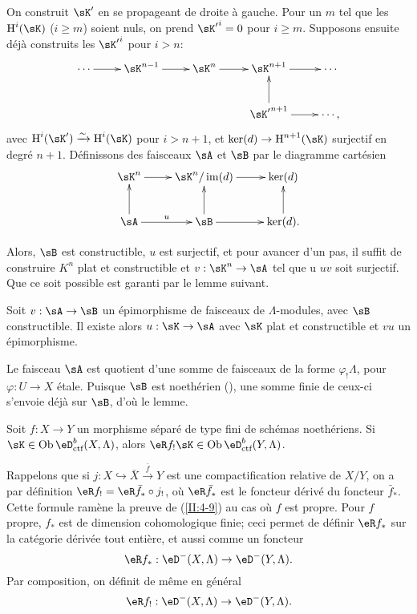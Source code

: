 On construit $\sK'$ en se propageant de droite à gauche. Pour un $m$ tel que les 
$\h^i(\sK)$ ($i\geqslant m$) soient nuls, on prend ${\sK'}^i = 0$ pour 
$i\geqslant m$. Supposons ensuite déjà construits les ${\sK'}^i$ pour 
$i>n$:
\[\xymatrix{
  \cdots \ar[r] 
    & \sK^{n-1} \ar[r] 
    & \sK^n \ar[r] 
    & \sK^{n+1} \ar[r] 
    & \cdots \\
  & & & {\sK'}^{n+1} \ar[u] \ar[r] 
    & \cdots \text{,}
}\]
avec $\h^i(\sK')\iso \h^i(\sK)$ pour $i>n+1$, et $\ker(d)\to\h^{n+1}(\sK)$ surjectif 
en degré $n+1$. Définissons des faisceaux $\sA$ et $\sB$ par le diagramme 
cartésien 
\[\xymatrix{
  \sK^n \ar[r] 
    & \sK^n/\im(d) \ar[r] 
    & \ker(d) \\
  \sA \ar[u] \ar[r]^u 
    & \sB \ar[u]\ar[r] 
    & \ker(d) \ar[u] \text{.}
}\]

Alors, $\sB$ est constructible, $u$ est surjectif, et pour avancer d'un pas, il 
suffit de construire $K^n$ plat et constructible et $v:\sK^n\to \sA$ tel que u
$u v$ soit surjectif. Que ce soit possible est garanti par le lemme suivant. 





\begin{lemma_}\label{II:4-8}
Soit $v:\sA\to \sB$ un épimorphisme de faisceaux de $\Lambda$-modules, avec 
$\sB$ constructible. Il existe alors $u:\sK\to \sA$ avec $\sK$ plat et 
constructible et $v u$ un épimorphisme. 
\end{lemma_}

Le faisceau $\sA$ est quotient d'une somme de faisceaux de la forme 
$\varphi_! \Lambda$, pour $\varphi:U\to X$ étale. Puisque $\sB$ est noethérien 
(\cite[IX.2.10]{sga4}), une somme finie de ceux-ci s'envoie déjà sur $\sB$, 
d'où le lemme. 





\begin{theorem_}\label{II:4-9}
Soit $f:X\to Y$ un morphisme séparé de type fini de schémas noethériens. 
Si $\sK\in\ob\eD_\textnormal{ctf}^b(X,\Lambda)$, alors 
$\eR f_!\sK\in \ob\eD_\textnormal{ctf}^b(Y,\Lambda)$. 
\end{theorem_}

Rappelons que si $j:X\hookrightarrow \bar X \xrightarrow{\bar f} Y$ est une 
compactification relative de $X/Y$, on a par définition 
$\eR f_! = \eR \bar f_* \circ j_!$, où $\eR \bar f_*$ est le foncteur dérivé 
du foncteur $\bar f_*$. Cette formule ramène la preuve de (\ref{II:4-9}) 
au cas où $f$ est propre. Pour $f$ propre, $f_*$ est de dimension 
cohomologique finie; ceci permet de définir $\eR f_*$ sur la catégorie 
dérivée tout entière, et aussi comme un foncteur 
\[
  \eR f_* : \eD^-(X,\Lambda) \to \eD^-(Y,\Lambda) \text{.}
\]
Par composition, on définit de même en général 
\[
  \eR f_! : \eD^-(X,\Lambda) \to \eD^-(Y,\Lambda) \text{.}
\]

